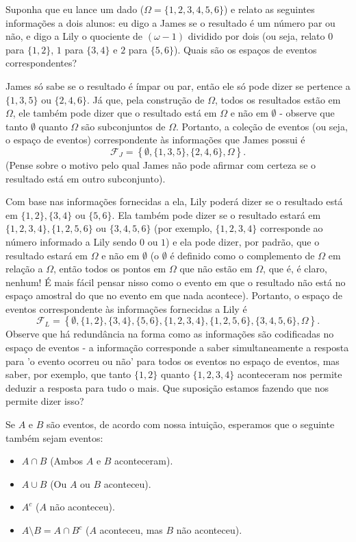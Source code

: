 \begin{example}
\label{ex: eventos e informações}
Suponha que eu lance um dado ($\Omega = \{1,2,3,4,5,6\}$) e relato as seguintes informações a dois alunos: eu digo a James se o resultado é um número par ou não, e digo a Lily o quociente de $(\omega-1)$ dividido por dois (ou seja, relato $0$ para $\{1,2\}$, $1$ para $\{3,4\}$ e $2$ para $\{5,6\}$). Quais são os espaços de eventos correspondentes?

James só sabe se o resultado é ímpar ou par, então ele só pode dizer se pertence a $\{1,3,5\}$ ou $\{2,4,6\}$. Já que, pela construção de $\Omega$, todos os resultados estão em $\Omega$, ele também pode dizer que o resultado está em $\Omega$ e não em $\emptyset$ - observe que tanto $\emptyset$ quanto $\Omega$ são subconjuntos de $\Omega$. Portanto, a coleção de eventos (ou seja, o espaço de eventos) correspondente às informações que James possui é 
\[
\mathcal{F}_J = \left\{ \emptyset, \{1,3,5\}, \{2,4,6\}, \Omega \right\}. 
\]
(Pense sobre o motivo pelo qual James não pode afirmar com certeza se o resultado está em outro subconjunto).

Com base nas informações fornecidas a ela, Lily poderá dizer se o resultado está em $\{1,2\}, \{3,4\}$ ou $\{5,6\}$. Ela também pode dizer se o resultado estará em $\{1,2,3,4\}, \{1,2,5,6\}$ ou $\{3,4,5,6\}$ (por exemplo, $\{1,2,3,4\}$ corresponde ao número informado a Lily sendo $0$ ou $1$) e ela pode dizer, por padrão, que o resultado estará em $\Omega$ e não em $\emptyset$ (o $\emptyset$ é definido como o complemento de $\Omega$ em relação a $\Omega$, então todos os pontos em $\Omega$ que não estão em $\Omega$, que é, é claro, nenhum! É mais fácil pensar nisso como o evento em que o resultado não está no espaço amostral do que no evento em que nada acontece). Portanto, o espaço de eventos correspondente às informações fornecidas a Lily é
\[
\mathcal{F}_L = \left\{ \emptyset, \{1,2\}, \{3,4\}, \{5,6\},\{1,2,3,4\},\{1,2,5,6\},\{3,4,5,6\},\Omega \right\}. 
\]
Observe que há redundância na forma como as informações são codificadas no espaço de eventos - a informação corresponde a saber simultaneamente a resposta para 'o evento ocorreu ou não' para todos os eventos no espaço de eventos, mas saber, por exemplo, que tanto $\{1,2\}$ quanto $\{1,2,3,4\}$ aconteceram nos permite deduzir a resposta para tudo o mais. Que suposição estamos fazendo que nos permite dizer isso?
\end{example}

Se $A$ e $B$ são eventos, de acordo com nossa intuição, esperamos que o seguinte também sejam eventos:
\begin{itemize}[noitemsep]
\item $A \cap B$ (Ambos $A$ e $B$ aconteceram).
\item $A \cup B$ (Ou $A$ ou $B$ aconteceu).
\item $A^c$ ($A$ não aconteceu).
\item $A \setminus B=A \cap B^c$ ($A$ aconteceu, mas $B$ não aconteceu).
\end{itemize}

